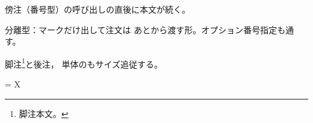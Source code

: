\documentclass[pdflatex,sidenote_length=20zw]{jlreq}
\begin{document}
傍注（番号型）の呼び出しの直後に本文が続く。

分離型：マークだけ出し\sidenotemark て注文は 
あとから渡す形。オプション番号指定も通す。

脚注\footnote{脚注本文。}と後注，
単体のもサイズ追従する。

\theendnotes
\makeatletter
=\vbox{\reset@font\footnotesize
  \ifdim\ptj@zwreg=8.00003pt\relax
    \typeout{SIDENOTE-JAREG-OK: \the\ptj@zwreg}%
  \else
    \errmessage{SIDENOTE-JAREG-NG: \the\ptj@zwreg\space (expected 8.00003pt)}%
  \fi
  X}%
\makeatother
\end{document}
